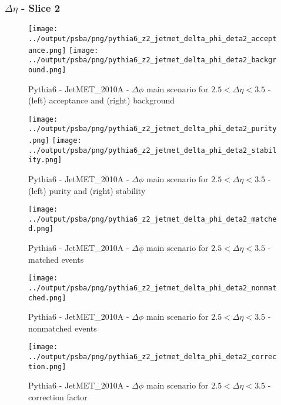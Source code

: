 \documentclass[11pt]{book}
\begin{document}
\clearpage
\subsubsection{$\Delta\eta$ - Slice 2}

\begin{figure}[ht]
\centering
\texttt{[image: ../output/psba/png/pythia6\_z2\_jetmet\_delta\_phi\_deta2\_acceptance.png]}
\texttt{[image: ../output/psba/png/pythia6\_z2\_jetmet\_delta\_phi\_deta2\_background.png]}
\caption{Pythia6 - JetMET\_2010A - $\Delta\phi$ main scenario for $2.5 < \Delta\eta < 3.5$ - (left) acceptance and (right) background}
\label{fig:p6_jetmet_delta_phi_deta2_ab}
\end{figure}

\begin{figure}[ht]
\centering
\texttt{[image: ../output/psba/png/pythia6\_z2\_jetmet\_delta\_phi\_deta2\_purity.png]}
\texttt{[image: ../output/psba/png/pythia6\_z2\_jetmet\_delta\_phi\_deta2\_stability.png]}
\caption{Pythia6 - JetMET\_2010A - $\Delta\phi$ main scenario for $2.5 < \Delta\eta < 3.5$ - (left) purity and (right) stability}
\label{fig:p6_jetmet_delta_phi_deta2_ps}
\end{figure}

\begin{figure}[ht]
\centering
\texttt{[image: ../output/psba/png/pythia6\_z2\_jetmet\_delta\_phi\_deta2\_matched.png]}
\caption{Pythia6 - JetMET\_2010A - $\Delta\phi$ main scenario for $2.5 < \Delta\eta < 3.5$ - matched events}
\label{fig:p6_jetmet_delta_phi_deta2_matched}
\end{figure}

\begin{figure}[ht]
\centering
\texttt{[image: ../output/psba/png/pythia6\_z2\_jetmet\_delta\_phi\_deta2\_nonmatched.png]}
\caption{Pythia6 - JetMET\_2010A - $\Delta\phi$ main scenario for $2.5 < \Delta\eta < 3.5$ - nonmatched events}
\label{fig:p6_jetmet_delta_phi_deta2_nonmatched}
\end{figure}

\begin{figure}[ht]
\centering
\texttt{[image: ../output/psba/png/pythia6\_z2\_jetmet\_delta\_phi\_deta2\_correction.png]}
\caption{Pythia6 - JetMET\_2010A - $\Delta\phi$ main scenario for $2.5 < \Delta\eta < 3.5$ - correction factor}
\label{fig:p6_jetmet_delta_phi_deta2_correction}
\end{figure}
\end{document}
